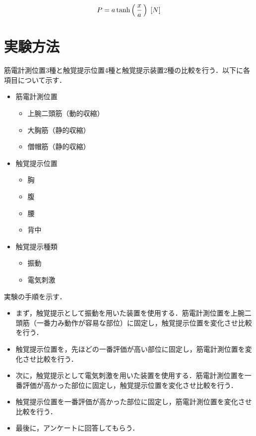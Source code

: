         \begin{eqnarray}
                \equlabel{haptics}
                P=a \tanh\left(\,\frac{x}{a}\,\right) \;[N]
        \end{eqnarray}
        
\section{実験方法}
        筋電計測位置3種と触覚提示位置4種と触覚提示装置2種の比較を行う．以下に各項目について示す．

        \begin{itemize}
        \item 筋電計測位置
                \begin{itemize}
                \item 上腕二頭筋（動的収縮）
                \item 大胸筋（静的収縮）
                \item 僧帽筋（静的収縮）
                \end{itemize}
        \item 触覚提示位置
                \begin{itemize}
                \item 胸
                \item 腹
                \item 腰
                \item 背中
                \end{itemize}
        \item 触覚提示種類
                \begin{itemize}
                \item 振動
                \item 電気刺激
                \end{itemize}
        \end{itemize}

        実験の手順を示す．
        \begin{itemize}
        \item まず，触覚提示として振動を用いた装置を使用する．筋電計測位置を上腕二頭筋（一番力み動作が容易な部位）に固定し，触覚提示位置を変化させ比較を行う．
        \item 触覚提示位置を，先ほどの一番評価が高い部位に固定し，筋電計測位置を変化させ比較を行う．
        \item 次に，触覚提示として電気刺激を用いた装置を使用する．筋電計測位置を一番評価が高かった部位に固定し，触覚提示位置を変化させ比較を行う．
        \item 触覚提示位置を一番評価が高かった部位に固定し，筋電計測位置を変化させ比較を行う．
        \item 最後に，アンケートに回答してもらう．
        \end{itemize}



